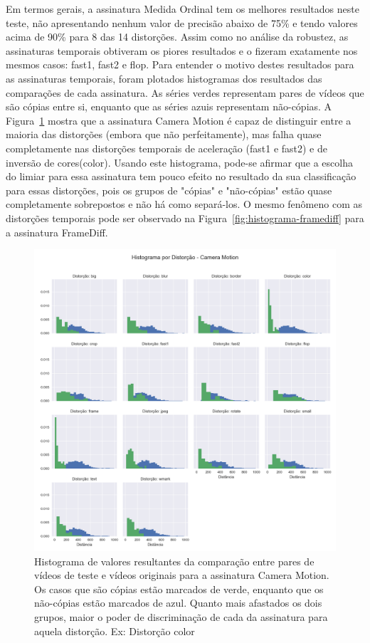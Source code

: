 Em termos gerais, a assinatura Medida Ordinal tem os melhores resultados neste teste, não apresentando nenhum valor de precisão abaixo de 75\% e tendo valores acima de 90\% para 8 das 14 distorções. Assim como no análise da robustez, as assinaturas temporais obtiveram os piores resultados e o fizeram exatamente nos mesmos casos: fast1, fast2 e flop. Para entender o motivo destes resultados para as assinaturas temporais, foram plotados histogramas dos resultados das comparações de cada assinatura. As séries verdes representam pares de vídeos que são cópias entre si, enquanto que as séries azuis representam não-cópias. A Figura~\ref{fig:histograma-camera-motion} mostra que a assinatura Camera Motion é capaz de distinguir entre a maioria das distorções (embora que não perfeitamente), mas falha quase completamente nas distorções temporais de aceleração (fast1 e fast2) e de inversão de cores(color). Usando este histograma, pode-se afirmar que a escolha do limiar para essa assinatura tem pouco efeito no resultado da sua classificação para essas distorções, pois os grupos de "cópias" e "não-cópias" estão quase completamente sobrepostos e não há como separá-los. O mesmo fenômeno com as distorções temporais pode ser observado na Figura~\ref{fig:histograma-framediff} para a assinatura FrameDiff. 

\begin{figure}[h]
	\centering
	\caption{Histograma de valores resultantes da comparação entre pares de vídeos de teste e vídeos originais para a assinatura Camera Motion. Os casos que são cópias estão marcados de verde, enquanto que os não-cópias estão marcados de azul. Quanto mais afastados os dois grupos, maior o poder de discriminação de cada da assinatura para aquela distorção. Ex: Distorção color}
	\label{fig:histograma-camera-motion}
	\includegraphics[width=\textwidth]{dados/figuras/experimentos/histograma_distorcao_Camera_Motion.png}
\end{figure}

